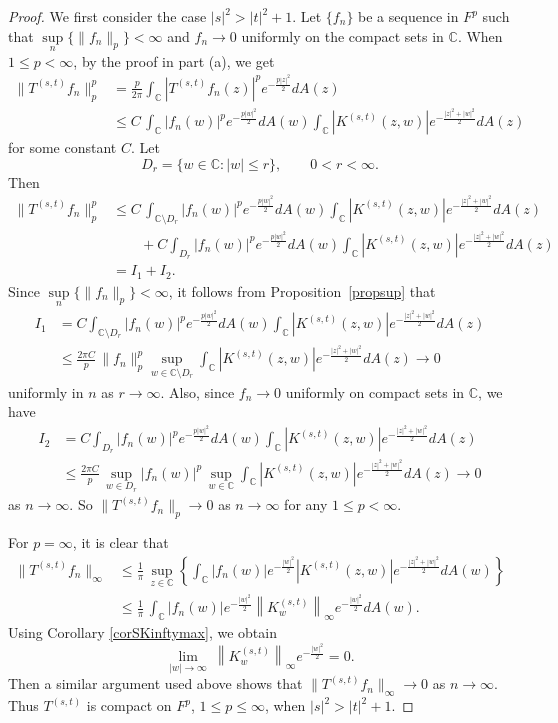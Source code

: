 \documentclass[reqno]{amsart}
\newcommand{\C}{{\mathbb C}}
\newcommand{\inc}{\int_{\C}}
\begin{document}
\begin{proof}
We first consider the case $|s|^2>|t|^2+1$. Let $\{f_n\}$ be a
sequence in $F^p$ such that $\sup\limits_n\{\|f_n\|_{p}\}<\infty$
and $f_n\rightarrow 0$ uniformly on the compact sets in $\C$.
When $1\leq p<\infty$, by the proof in part (a), we get
\begin{align*}
\|T^{(s, t)}f_n\|_p^p &=\frac{p}{2\pi}\inc \left|T^{(s,t)}f_n(z)
\right|^pe^{-\frac{p|z|^2}{2}}dA(z)\\
&\leq C\,\inc|f_n(w)|^pe^{-\frac{p|w|^2}{2}}dA(w)
\inc\left|K^{(s,t)}(z,w)\right|e^{-\frac{|z|^2+|w|^2}{2}}dA(z)
\end{align*}
for some constant $C$. Let
$$D_r=\{w\in\C: |w|\leq r\},\qquad 0<r<\infty.$$
Then
\begin{align*}
\|T^{(s, t)}f_n\|_p^p&\leq C\,\int_{\C\setminus D_r}|f_n(w)|^p
e^{-\frac{p|w|^2}{2}}dA(w)\inc\left|K^{(s,t)}(z,w)\right|
e^{-\frac{|z|^2+|w|^2}{2}}dA(z)\\
&\qquad+C\int_{D_r} |f_n(w)|^pe^{-\frac{p|w|^2}{2}}dA(w)
\inc \left|K^{(s,t)}(z,w)\right|e^{-\frac{|z|^2+|w|^2}{2}}dA(z)\\
&= I_1+I_2.
\end{align*}
Since $\sup\limits_n\{\|f_n\|_{p}\}<\infty$, it follows from
Proposition~\ref{propsup} that
\begin{align*}
I_1&= C\int_{\C\setminus D_r} |f_n(w)|^pe^{-\frac{p|w|^2}{2}}dA(w)
\inc \left|K^{(s,t)}(z,w)\right|e^{-\frac{|z|^2+|w|^2}{2}}dA(z)\\
&\leq \frac{2\pi C}{p}\,\|f_n\|_{p}^p\sup_{w\in \C\setminus D_r}
\inc\left|K^{(s,t)}(z,w)\right|e^{-\frac{|z|^2+|w|^2}{2}}dA(z)\rightarrow 0
\end{align*}
uniformly in $n$ as $r\rightarrow\infty$. Also, since $f_n\rightarrow 0$
uniformly on compact sets in $\C$, we have
\begin{align*}
I_2&=C\int_{D_r}|f_n(w)|^pe^{-\frac{p|w|^2}{2}}dA(w)
\inc\left|K^{(s,t)}(z,w)\right|e^{-\frac{|z|^2+|w|^2}{2}}dA(z)\\
&\leq\frac{2\pi C}{p}\,\sup_{w\in D_r}|f_n(w)|^p\,\sup_{w\in \C}
\inc\left|K^{(s,t)}(z,w)\right|e^{-\frac{|z|^2+|w|^2}{2}}dA(z)\rightarrow 0
\end{align*}
as $n\rightarrow\infty$. So $\|T^{(s, t)}f_n\|_p\rightarrow 0$ as
$n\rightarrow\infty$ for any $1\leq p<\infty$.

For $p=\infty$, it is clear that
\begin{align*}
    \|T^{(s, t)}f_n\|_\infty&\leq \frac{1}{\pi}\,\sup_{z\in\C}
\left\{\inc |f_n(w)|e^{-\frac{|w|^2}{2}}\left|K^{({s},t)}(z,w)
\right|e^{-\frac{|z|^2+|w|^2}{2}}dA(w)\right\}\\
&\leq \frac{1}{\pi}\, \inc |f_n(w)|e^{-\frac{|w|^2}{2}} 
\left\|K^{(s,t)}_w\right\|_\infty e^{-\frac{|w|^2}{2}} dA(w).
\end{align*}
Using Corollary \ref{corSKinftymax}, we obtain
$$\lim_{|w|\rightarrow\infty}\ \left\|K^{(s,t)}_w\right\|_\infty 
e^{-\frac{|w|^2}{2}}=0.$$
Then a similar argument used above shows that
$\|T^{(s, t)}f_n\|_\infty\rightarrow 0$ as $n\rightarrow\infty$.
Thus $T^{(s,t)}$ is compact on $F^p$, $1\le p\le\infty$, when
$|s|^2>|t|^2+1$.


\end{proof}
\end{document}
